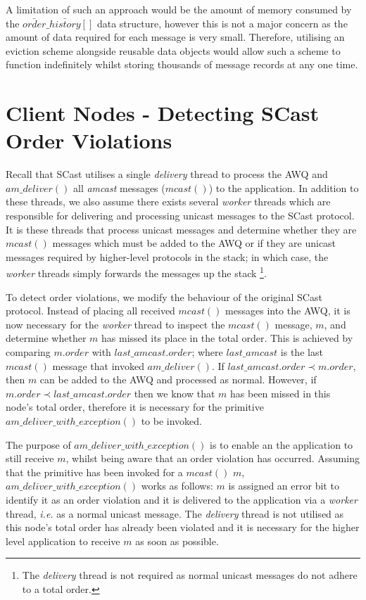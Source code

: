     A limitation of such an approach would be the amount of memory consumed by the $\bar{order}\_\bar{history}[]$ data structure, however this is not a major concern as the amount of data required for each message is very small.  Therefore, utilising an eviction scheme alongside reusable data objects would allow such a scheme to function indefinitely whilst storing thousands of message records at any one time.  

\section{Client Nodes - Detecting \textsf{SCast} Order Violations}
Recall that \textsf{SCast} utilises a single \emph{delivery} thread to process the AWQ and $am\_deliver()$ all \emph{amcast} messages ($mcast()$) to the application.  In addition to these threads, we also assume there exists several \emph{worker} threads which are responsible for delivering and processing unicast messages to the \textsf{SCast} protocol.  It is these threads that process unicast messages and determine whether they are $mcast()$ messages which must be added to the AWQ or if they are unicast messages required by higher-level protocols in the stack; in which case, the \emph{worker} threads simply forwards the messages up the stack \footnote{The \emph{delivery} thread is not required as normal unicast messages do not adhere to a total order.}.  

To detect order violations, we modify the behaviour of the original \textsf{SCast} protocol.  Instead of placing all received $mcast()$ messages into the AWQ, it is now necessary for the \emph{worker} thread to inspect the $mcast()$ message, $m$, and determine whether $m$ has missed its place in the total order.  This is achieved by comparing $m.order$ with $last\_amcast.order$; where $last\_amcast$ is the last $mcast()$ message that invoked $am\_deliver()$.  If $last\_amcast.order \prec m.order$, then $m$ can be added to the AWQ and processed as normal.  However, if $m.order \prec last\_amcast.order$ then we know that $m$ has been missed in this node's total order, therefore it is necessary for the primitive $am\_deliver\_with\_exception()$ to be invoked.  

The purpose of $am\_deliver\_with\_exception()$ is to enable an the application to still receive $m$, whilst being aware that an order violation has occurred.  Assuming that the primitive has been invoked for a $mcast()$ $m$, $am\_deliver\_with\_exception()$ works as follows:  $m$ is assigned an error bit to identify it as an order violation and it is delivered to the application via a \emph{worker} thread, \emph{i.e.} as a normal unicast message.  The \emph{delivery} thread is not utilised as this node's total order has already been violated and it is necessary for the higher level application to receive $m$ as soon as possible.  

